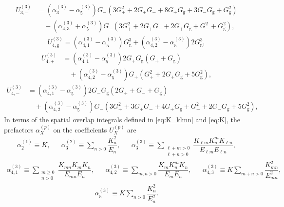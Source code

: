 \documentclass[preprint,showkeys,nofootinbib]{revtex4-1}
\newcommand{\f}{\dfrac} %
\newcommand{\p}[1]{\left(#1\right)} %
\newcommand{\g}{\text{g}}
\newcommand{\n}{\hat{n}}
\newcommand{\1}{\mathds{1}}
\begin{document}
\begin{align}
  U_{3,-}^{(3)}
  &= \p{\alpha_3^{(3)} - \alpha_5^{(3)}} G_- \p{3 G_+^2
    + 2 G_+ G_- + 8 G_+ G_\g + 3 G_- G_\g + G_\g^2} \nonumber \\
  &\quad - \p{\alpha_{4,3}^{(3)} + \alpha_5^{(3)}}
  G_- \p{3 G_+^2 + 2 G_+ G_- + 2 G_+ G_\g + G_-^2 + G_\g^2},
\end{align}
\begin{align}
  U_{4,\g}^{(3)}
  = \p{\alpha_{4,1}^{(3)} - \alpha_5^{(3)}} G_\g^3
  + \p{\alpha_{4,2}^{(3)} - \alpha_5^{(3)}} 2 G_\g^3,
\end{align}
\begin{align}
  U_{4,+}^{(3)}
  &= \p{\alpha_{4,1}^{(3)} - \alpha_5^{(3)}}
  2 G_+ G_\g \p{G_+ + G_\g} \nonumber \\
  &\quad + \p{\alpha_{4,2}^{(3)} - \alpha_5^{(3)}}
  G_+ \p{G_+^2 + 2 G_+ G_\g + 5 G_\g^2},
\end{align}
\begin{align}
  U_{4,-}^{(3)}
  &= \p{\alpha_{4,1}^{(3)} - \alpha_5^{(3)}}
  2 G_- G_\g \p{2 G_+ + G_- + G_\g} \nonumber \\
  &\quad + \p{\alpha_{4,2}^{(3)} - \alpha_5^{(3)}}
  G_- \p{3 G_+^2 + 3 G_+ G_- + 4 G_+ G_\g + G_-^2
    + 2 G_- G_\g + 5 G_\g^2},
\end{align}
In terms of the spatial overlap integrals defined in \eqref{eq:K_klmn}
and \eqref{eq:K}, the prefactors $\alpha_X^{(p)}$ on the coefficients
$U_X^{(p)}$ are
\begin{align}
  \alpha_2^{(1)} \equiv K,
  &&
  \alpha_3^{(2)} \equiv \sum_{n>0} \f{K_n^2}{E_n},
  &&
  \alpha_3^{(3)} \equiv \sum_{\substack{\ell+m>0\\\ell+n>0}}
  \f{K_{\ell m} K^m_n K_{\ell n}}{E_{\ell m} E_{\ell n}},
\end{align}
\begin{align}
  \alpha_{4,1}^{(3)}
  \equiv \sum_{\substack{m\ge0\\n>0}} \f{K_{mn} K_m K_n}{E_{mn} E_n},
  &&
  \alpha_{4,2}^{(3)}
  \equiv \sum_{m,n>0} \f{K_m K^m_n K_n}{E_m E_n},
  &&
  \alpha_{4,3}^{(3)}
  \equiv K \sum_{m+n>0} \f{K_{mn}^2}{E_{mn}^2},
\end{align}
\begin{align}
  \alpha_5^{(3)}
  \equiv  K \sum_{n>0} \f{K_n^2}{E_n^2}.
\end{align}


\end{document}
